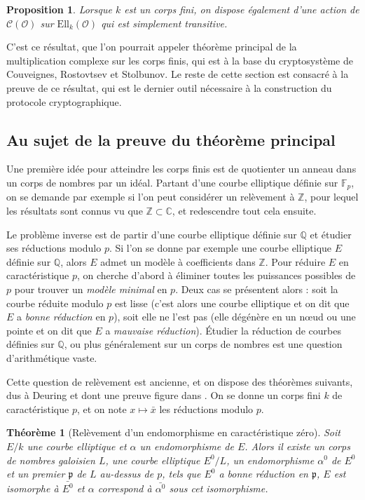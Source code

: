 \documentclass[11pt,a4paper]{article}
\newcommand{\Z}{\mathbb{Z}}
\newcommand{\C}{\mathbb{C}}
\newcommand{\F}{\mathbb{F}}
\newcommand{\Q}{\mathbb{Q}}
\renewcommand{\O}{\mathcal{O}}
\newcommand{\Cl}{\mathcal{C}}
\newcommand{\Ell}{\mathrm{Ell}}
\renewcommand{\frak}{\mathfrak}
\renewcommand{\v}{\vspace{5mm}}
\newtheorem*{thm}{Théorème}
\newtheorem*{prop}{Proposition}
\theoremstyle{definition}
\begin{document}
\begin{prop}

Lorsque $k$ est un corps fini, on dispose également d'une action de $\Cl(\O)$ sur $\Ell_k(\O)$ qui est simplement transitive.

\end{prop}

C'est ce résultat, que l'on pourrait appeler \og théorème principal de la multiplication complexe sur les corps finis\fg, qui est à la base du cryptosystème de Couveignes, Rostovtsev et Stolbunov. Le reste de cette section est consacré à la preuve de ce résultat, qui est le dernier outil nécessaire à la construction du protocole cryptographique.

\subsection{Au sujet de la preuve du théorème principal}

Une première idée pour atteindre les corps finis est de quotienter un anneau dans un corps de nombres par un idéal. Partant d'une courbe elliptique définie sur $\F_p$, on se demande par exemple si l'on peut considérer un relèvement à $\Z$, pour lequel les résultats sont connus vu que $\Z\subset\C$, et redescendre tout cela ensuite. 

Le problème inverse est de partir d'une courbe elliptique définie sur $\Q$ et étudier ses réductions modulo $p$. Si l'on se donne par exemple une courbe elliptique $E$ définie sur $\Q$, alors $E$ admet un modèle à coefficients dans $\Z$. Pour réduire $E$ en caractéristique $p$, on cherche d'abord à éliminer toutes les puissances possibles de $p$ pour trouver un \emph{modèle minimal} en $p$. Deux cas se présentent alors : soit la courbe réduite modulo $p$ est lisse (c'est alors une courbe elliptique et on dit que $E$ a \emph{bonne réduction} en $p$), soit elle ne l'est pas (elle dégénère en un n\oe ud ou une pointe et on dit que $E$ a \emph{mauvaise réduction}). Étudier la réduction de courbes définies sur $\Q$, ou plus généralement sur un corps de nombres est une question d'arithmétique vaste.

\v

Cette question de relèvement est ancienne, et on dispose des théorèmes suivants, dus à Deuring et dont une preuve figure dans \cite{Lang}. On se donne un corps fini $k$ de caractéristique $p$, et on note $x\mapsto\bar{x}$ les réductions modulo $p$.

\begin{thm}[Relèvement d'un endomorphisme en caractéristique zéro]

Soit $E/k$ une courbe elliptique et $\alpha$ un endomorphisme de $E$. Alors il existe un corps de nombres galoisien $L$, une courbe elliptique $E^0/L$, un endomorphisme $\alpha^0$ de $E^0$ et un premier $\frak p$ de $L$ au-dessus de $p$, tels que $E^0$ a bonne réduction en $\frak p$, $E$ est isomorphe à $\bar{E^0}$ et $\alpha$ correspond à $\bar{\alpha^0}$ sous cet isomorphisme.

\end{thm}
\end{document}
